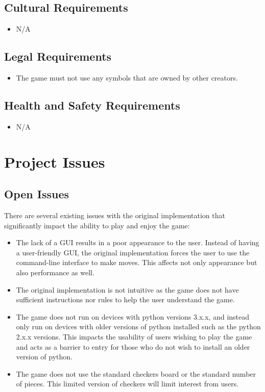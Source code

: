 \documentclass[12pt, titlepage]{article}
\begin{document}
\subsection{Cultural Requirements}
\begin{itemize}
    \item N/A
\end{itemize}

\subsection{Legal Requirements}
\begin{itemize}
    \item The game must not use any symbols that are owned by other creators.
\end{itemize}

\subsection{Health and Safety Requirements}
\begin{itemize}
    \item N/A
\end{itemize}
\section{Project Issues}

\subsection{Open Issues}
There are several existing issues with the original implementation that significantly impact the ability to play and enjoy the game:
\begin{itemize}
\item The lack of a GUI results in a poor appearance to the user. Instead of having a user-friendly GUI, the original implementation forces the user to use the command-line interface to make moves. This affects not only appearance but also performance as well.
\item The original implementation is not intuitive as the game does not have sufficient instructions nor rules to help the user understand the game.
\item The game does not run on devices with python versions 3.x.x, and instead only run on devices with older versions of python installed such as the python 2.x.x versions. This impacts the usability of users wishing to play the game and acts as a barrier to entry for those who do not wish to install an older version of python.
\item The game does not use the standard checkers board or the standard number of pieces. This limited version of checkers will limit interest from users.
\end{itemize}
\end{document}
